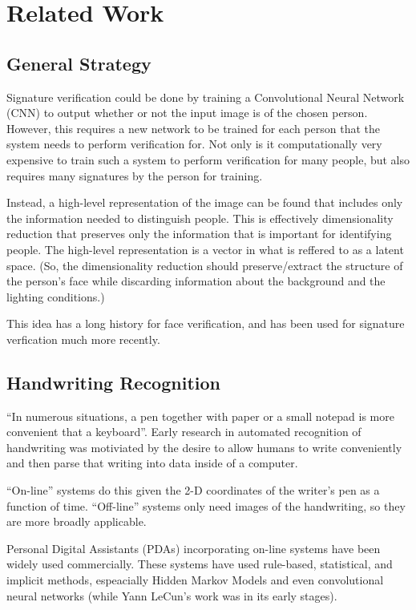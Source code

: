 \section{Related Work}\label{sec:related_work}

\subsection{General Strategy}
Signature verification could be done by training a Convolutional Neural Network (CNN) to output whether or not the input image is of the chosen person.
However, this requires a new network to be trained for each person that the system needs to perform verification for.
Not only is it computationally very expensive to train such a system to perform verification for many people, but also requires many signatures by the person for training.

Instead, a high-level representation of the image can be found that includes only the information needed to distinguish people.
This is effectively dimensionality reduction that preserves only the information that is important for identifying people.
The high-level representation is a vector in what is reffered to as a latent space.
(So, the dimensionality reduction should preserve/extract the structure of the person's face while discarding information about the background and the lighting conditions.)

This idea has a long history for face verification\cite{LeCun}, and has been used for signature verfication much more recently\cite{sig_net}.

\subsection{Handwriting Recognition} %
``In numerous situations, a pen together with paper or a small notepad is more convenient that a keyboard''\cite{handwriting_survey}.
Early research in automated recognition of handwriting was motiviated by the desire to allow humans to write conveniently and then parse that writing into data inside of a computer.

``On-line'' systems do this given the 2-D coordinates of the writer's pen as a function of time.%
``Off-line'' systems only need images of the handwriting, so they are more broadly applicable\cite{handwriting_survey}.

Personal Digital Assistants (PDAs) incorporating on-line systems have been widely used commercially.
These systems have used rule-based, statistical, and implicit methods\cite{handwriting_survey}, espeacially Hidden Markov Models and even convolutional neural networks\cite{389575} (while Yann LeCun's work was in its early stages\cite{mnist}).

